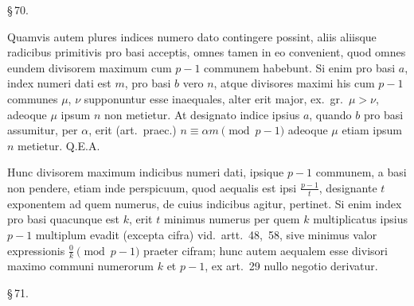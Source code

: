 \documentclass[12pt,a4paper]{article}
\theoremstyle{plain}
\theoremstyle{definition}
\theoremstyle{remark}
\begin{document}
\begin{center}\S\,70.\end{center}

Quamvis autem plures indices numero dato contingere possint, aliis aliisque radicibus primitivis pro basi acceptis, omnes tamen in eo convenient, quod omnes eundem divisorem maximum cum $p-1$ communem habebunt. Si enim pro basi $a$, index numeri dati est $m$, pro basi $b$ vero $n$, atque divisores maximi his cum $p-1$ communes $\mu$, $\nu$ supponuntur esse inaequales, alter erit major, ex.\ gr.\ $\mu > \nu$, adeoque $\mu$ ipsum $n$ non metietur. At designato indice ipsius $a$, quando $b$ pro basi assumitur, per $\alpha$, erit (art.\ praec.) $n \equiv \alpha m \pmod{p-1}$ adeoque $\mu$ etiam ipsum $n$ metietur. Q.E.A.

Hunc divisorem maximum indicibus numeri dati, ipsique $p-1$ communem, a basi non pendere, etiam inde perspicuum, quod aequalis est ipsi $\frac{p-1}{t}$, designante $t$ exponentem ad quem numerus, de cuius indicibus agitur, pertinet. Si enim index pro basi quacunque est $k$, erit $t$ minimus numerus per quem $k$ multiplicatus ipsius $p-1$ multiplum evadit (excepta cifra) vid.\ artt.~48,~58, sive minimus valor expressionis $\frac{0}{k} \pmod{p-1}$ praeter cifram; hunc autem aequalem esse divisori maximo communi numerorum $k$ et $p-1$, ex art.~29 nullo negotio derivatur.

\begin{center}\S\,71.\end{center}
\end{document}
